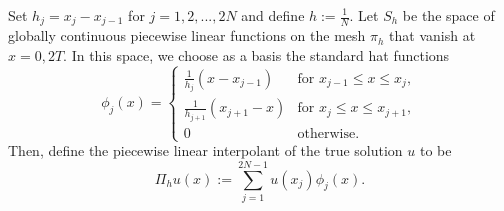 \documentclass{amsart}
\theoremstyle{definition}
\theoremstyle{remark}
\numberwithin{equation}{section}
\begin{document}
Set
\(
  h_j = x_{j} - x_{j-1}
\) for $j = 1, 2, ... ,  2N$ 
and define $h := \frac{1}{N}$.
Let $S_h$ be the space of globally continuous piecewise linear functions on the mesh $\pi_h$
that vanish at $x = 0, 2T$. In this space, we choose as a basis the standard hat functions
\begin{equation}
  \phi_j(x) = \begin{cases}
    \frac{1}{h_j} (x-x_{j-1})   & \text{for  } x_{j-1} \le x \le x_{j} ,\\
    \frac{1}{h_{j+1}} (x_{j+1}-x) & \text{for  } x_{j} \le x \le x_{j+1} ,\\
    0                       & \text{otherwise} .
  \end{cases}
\end{equation}
Then, define the piecewise linear interpolant of the true solution \(u\) to be
\begin{equation} \label{def:interp}
  \Pi_hu(x) := \sum_{j=1}^{2N-1} u(x_j) \phi_j(x).
\end{equation}

\end{document}
